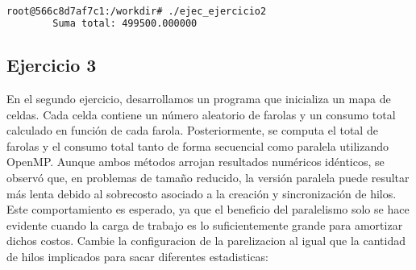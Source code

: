 \documentclass{article}
\begin{document}
	\begin{lstlisting}[style=consola, language=bash, caption={Salida de la ejecución del Ejercicio 2.}]
		root@566c8d7af7c1:/workdir# ./ejec_ejercicio2
		Suma total: 499500.000000	\end{lstlisting}
	
	\subsection{Ejercicio 3}
	En el segundo ejercicio, desarrollamos un programa que inicializa un mapa de celdas. Cada celda contiene un número aleatorio de farolas y un consumo total calculado en función de cada farola. Posteriormente, se computa el total de farolas y el consumo total tanto de forma secuencial como paralela utilizando OpenMP. Aunque ambos métodos arrojan resultados numéricos idénticos, se observó que, en problemas de tamaño reducido, la versión paralela puede resultar más lenta debido al sobrecosto asociado a la creación y sincronización de hilos. Este comportamiento es esperado, ya que el beneficio del paralelismo solo se hace evidente cuando la carga de trabajo es lo suficientemente grande para amortizar dichos costos. Cambie la configuracion de la parelizacion al igual que la cantidad de hilos implicados para sacar diferentes estadisticas:
	
\end{document}
